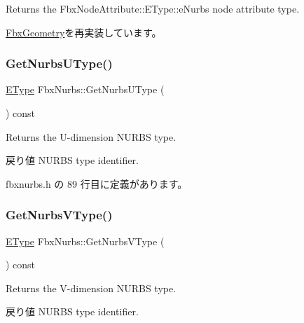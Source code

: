Returns the Fbx\+Node\+Attribute\+::\+E\+Type\+::e\+Nurbs node attribute type. 



\hyperlink{class_fbx_geometry_a41ae23e5d0cf08693bca49737f333de9}{Fbx\+Geometry}を再実装しています。

\mbox{\label{class_fbx_nurbs_a3e11b91a48634ca8a7e082f80aae9013}} 
\subsubsection{\texorpdfstring{Get\+Nurbs\+U\+Type()}{GetNurbsUType()}}
{\footnotesize\ttfamily \hyperlink{class_fbx_nurbs_a16d9562676c9d3511503551790c55643}{E\+Type} Fbx\+Nurbs\+::\+Get\+Nurbs\+U\+Type (\begin{DoxyParamCaption}{ }\end{DoxyParamCaption}) const\hspace{0.3cm}{\ttfamily [inline]}}

Returns the U-\/dimension N\+U\+R\+BS type. \begin{DoxyReturn}{戻り値}
N\+U\+R\+BS type identifier. 
\end{DoxyReturn}


 fbxnurbs.\+h の 89 行目に定義があります。

\mbox{\label{class_fbx_nurbs_a07928e9890078aa451609132d263167c}} 
\subsubsection{\texorpdfstring{Get\+Nurbs\+V\+Type()}{GetNurbsVType()}}
{\footnotesize\ttfamily \hyperlink{class_fbx_nurbs_a16d9562676c9d3511503551790c55643}{E\+Type} Fbx\+Nurbs\+::\+Get\+Nurbs\+V\+Type (\begin{DoxyParamCaption}{ }\end{DoxyParamCaption}) const\hspace{0.3cm}{\ttfamily [inline]}}

Returns the V-\/dimension N\+U\+R\+BS type. \begin{DoxyReturn}{戻り値}
N\+U\+R\+BS type identifier. 
\end{DoxyReturn}



